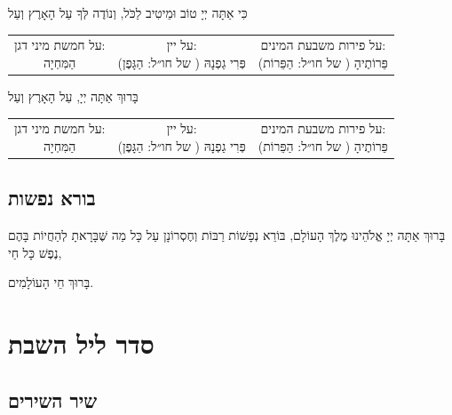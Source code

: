 \documentclass[11pt,twoside]{article}
\newcommand{\instruction}[1]{%
\ifhmode\else\noindent\fi%
{\plain\tiny{#1}}%
}
\begin{document}
{\centering%
כִּי אַתָּה יְיָ טוֹב וּמֵיטִיב לַכֹּל, וְנוֹדֶה לְּךָ עַל הָאָרֶץ וְעַל

{\footnotesize%
  \begin{tabular}{ccc}
  \makecell{\instruction{על חמשת מיני דגן:}\\הַמִּחְיָה} &
  \makecell{\instruction{על יין:}\\פְּרִי גַפְנָהּ (\instruction{של חו״ל:} הַגָּפֶן)} &
  \makecell{\instruction{על פירות משבעת המינים:}\\פֵּרוֹתֶיהָ (\instruction{של חו״ל:} הַפֵּרוֹת)} \\
\end{tabular}\par%
}

בָּרוּךְ אַתָּה יְיָ, עַל הָאָרֶץ וְעַל

{\footnotesize%
  \begin{tabular}{ccc}
  \makecell{\instruction{על חמשת מיני דגן:}\\הַמִּחְיָה} &
  \makecell{\instruction{על יין:}\\פְּרִי גַפְנָהּ (\instruction{של חו״ל:} הַגָּפֶן)} &
  \makecell{\instruction{על פירות משבעת המינים:}\\פֵּרוֹתֶיהָ (\instruction{של חו״ל:} הַפֵּרוֹת)} \\
\end{tabular}\par%
}}

\newpage

\subsection{בורא נפשות}

{\parfillskip=0pt%
בָּרוּךְ אַתָּה יְיָ אֱלֹהֵינוּ מֶלֶךְ הָעוֹלָם, בּוֹרֵא נְפָשׁוֹת רַבּוֹת וְחֶסְרוֹנָן עַל כָּל מַה שֶּׁבָּרָאתָ
לְהַחֲיוֹת בָּהֶם נֶפֶשׁ כָּל חַי,\par%
}
{\centering\Large%
בָּרוּךְ חֵי הָעוֹלָמִים.\par%
}
\vfill%

\section{סדר ליל השבת}

\subsection{שיר השירים}
\end{document}

